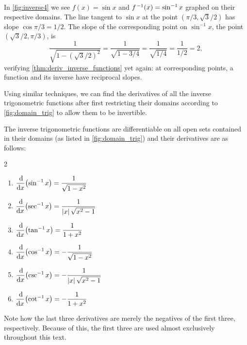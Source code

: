 In \autoref{fig:inverse4} we see $f(x) = \sin x$ and $f\primeskip^{-1}(x)=\sin^{-1} x$ graphed on their respective domains. The line tangent to $\sin x$ at the point $(\pi/3, \sqrt{3}/2)$ has slope $\cos \pi/3 = 1/2$. The slope of the corresponding point on $\sin^{-1}x$, the point $(\sqrt{3}/2,\pi/3)$, is
\[\frac{1}{\sqrt{1-(\sqrt{3}/2)^2}} = \frac{1}{\sqrt{1-3/4}} = \frac{1}{\sqrt{1/4}} = \frac{1}{1/2}=2,\]
verifying \autoref{thm:deriv_inverse_functions} yet again: at corresponding points, a function and its inverse have reciprocal slopes.\bigskip

Using similar techniques, we can find the derivatives of all the inverse trigonometric functions after first restricting their domains according to \autoref{fig:domain_trig} to allow them to be invertible.

{
\begin{theorem}\label{thm:deriv_inverse_trig}%
The inverse trigonometric functions are differentiable on all open sets contained in their domains (as listed in \autoref{fig:domain_trig}) and their derivatives are as follows:
\begin{multicols}{2}
	\begin{enumerate}
		\item	$\displaystyle\frac {\operatorname{d}\!}{\operatorname{d}\! x}\bigl(\sin^{-1}x\bigr)= \frac1{\sqrt{1-x^2}}$ 
		\item	$\displaystyle\frac {\operatorname{d}\!}{\operatorname{d}\! x}\bigl(\sec^{-1}x\bigr)= \frac1{\left\lvert x \right\rvert\sqrt{x^2-1}}$
		\item	$\displaystyle\frac {\operatorname{d}\!}{\operatorname{d}\! x}\bigl(\tan^{-1}x\bigr)= \frac1{1+x^2}$
		\item	$\displaystyle\frac {\operatorname{d}\!}{\operatorname{d}\! x}\bigl(\cos^{-1}x\bigr)=-\frac1{\sqrt{1-x^2}}$ 
		\item	$\displaystyle\frac {\operatorname{d}\!}{\operatorname{d}\! x}\bigl(\csc^{-1}x\bigr)=-\frac1{\left\lvert x \right\rvert\sqrt{x^2-1}}$
		\item	$\displaystyle\frac {\operatorname{d}\!}{\operatorname{d}\! x}\bigl(\cot^{-1}x\bigr)=-\frac1{1+x^2}$
	\end{enumerate}
\end{multicols}
\end{theorem}}

Note how the last three derivatives are merely the negatives of the first three, respectively. Because of this, the first three are used almost exclusively throughout this text.

